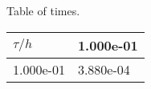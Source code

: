 \begin{center}
Table of times.
  
\begin{tabular}{|p{1in}|p{1in}|} \hline
$\tau / h$ &1.000e-01 \\ \hline 
1.000e-01 &3.880e-04 \\ \hline 

\end{tabular}\\[20pt]
\end{center}
